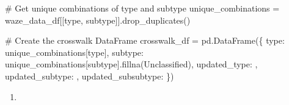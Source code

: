 \documentclass[
  letterpaper,
  DIV=11,
  numbers=noendperiod]{scrartcl}
\newenvironment{Shaded}{\begin{snugshade}}{\end{snugshade}}
\newcommand{\CommentTok}[1]{\textcolor[rgb]{0.37,0.37,0.37}{#1}}
\newcommand{\NormalTok}[1]{\textcolor[rgb]{0.00,0.23,0.31}{#1}}
\newcommand{\OperatorTok}[1]{\textcolor[rgb]{0.37,0.37,0.37}{#1}}
\newcommand{\StringTok}[1]{\textcolor[rgb]{0.13,0.47,0.30}{#1}}
\providecommand{\tightlist}{%
  \setlength{\itemsep}{0pt}\setlength{\parskip}{0pt}}\usepackage{longtable,booktabs,array}
\begin{document}
\begin{Shaded}
\begin{Highlighting}[]
\CommentTok{\# Get unique combinations of type and subtype}
\NormalTok{unique\_combinations }\OperatorTok{=}\NormalTok{ waze\_data\_df[[}\StringTok{\textquotesingle{}type\textquotesingle{}}\NormalTok{, }\StringTok{\textquotesingle{}subtype\textquotesingle{}}\NormalTok{]].drop\_duplicates()}

\CommentTok{\# Create the crosswalk DataFrame}
\NormalTok{crosswalk\_df }\OperatorTok{=}\NormalTok{ pd.DataFrame(\{}
    \StringTok{\textquotesingle{}type\textquotesingle{}}\NormalTok{: unique\_combinations[}\StringTok{\textquotesingle{}type\textquotesingle{}}\NormalTok{],}
    \StringTok{\textquotesingle{}subtype\textquotesingle{}}\NormalTok{: unique\_combinations[}\StringTok{\textquotesingle{}subtype\textquotesingle{}}\NormalTok{].fillna(}\StringTok{\textquotesingle{}Unclassified\textquotesingle{}}\NormalTok{),}
    \StringTok{\textquotesingle{}updated\_type\textquotesingle{}}\NormalTok{: }\StringTok{\textquotesingle{}\textquotesingle{}}\NormalTok{,}
    \StringTok{\textquotesingle{}updated\_subtype\textquotesingle{}}\NormalTok{: }\StringTok{\textquotesingle{}\textquotesingle{}}\NormalTok{,}
    \StringTok{\textquotesingle{}updated\_subsubtype\textquotesingle{}}\NormalTok{: }\StringTok{\textquotesingle{}\textquotesingle{}}
\NormalTok{\})}
\end{Highlighting}
\end{Shaded}

\begin{enumerate}
\def\labelenumi{\arabic{enumi}.}
\setcounter{enumi}{1}
\tightlist
\item
\end{enumerate}
\end{document}
